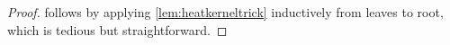 \documentclass[10pt,a4paper]{amsart}
\DeclareMathOperator{\ch}{ch}
\newcommand*\diff{\mathop{}\!\mathrm{d}}
\newcommand{\fpart}{\Pi} %
\newcommand{\fsp}{f_\mathrm{sp}}
\newcommand{\interp}{\overline{x}} %
\DeclareMathOperator{\nd}{nd}
\newcommand{\rfy}[1]{\widetilde{{#1}}} %
\DeclareMathOperator{\rt}{rt}
\begin{document}
\begin{proof}
     follows by applying \cref{lem:heatkerneltrick} inductively from leaves to root, which is tedious but straightforward.


\end{proof}
\end{document}
